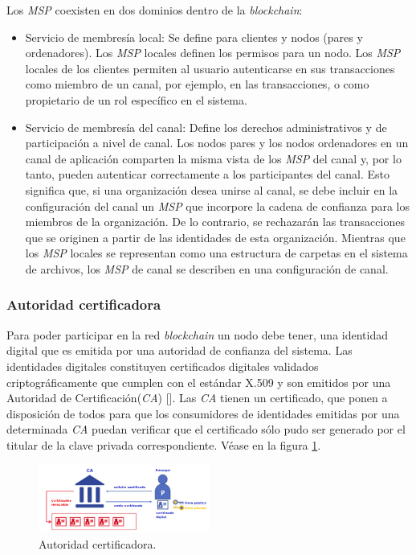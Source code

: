 Los \emph{MSP} coexisten en dos dominios dentro de la \emph{blockchain}:
\begin{itemize}
\item Servicio de membres\'ia local: Se define para clientes y nodos (pares y ordenadores). Los \emph{MSP} locales definen los permisos para un nodo. Los \emph{MSP} locales de los clientes permiten al usuario autenticarse en sus transacciones como miembro de un canal, por ejemplo, en las transacciones, o como propietario de un rol espec\'ifico en el sistema.

\item Servicio de membres\'ia del canal: Define los derechos administrativos y de participaci\'on a nivel de canal. Los nodos pares y los nodos ordenadores en un canal de aplicaci\'on comparten la misma vista de los \emph{MSP} del canal y, por lo tanto, pueden autenticar correctamente a los participantes del canal. Esto significa que, si una organizaci\'on desea unirse al canal, se debe incluir en la configuraci\'on del canal un \emph{MSP} que incorpore la cadena de confianza para los miembros de la organizaci\'on. De lo contrario, se rechazar\'an las transacciones que se originen a partir de las identidades de esta organizaci\'on. Mientras que los \emph{MSP} locales se representan como una estructura de carpetas en el sistema de archivos, los \emph{MSP} de canal se describen en una configuraci\'on de canal.
\end{itemize}

\subsubsection{Autoridad certificadora}
Para poder participar en la red \emph{blockchain} un nodo debe tener, una identidad digital que es emitida por una autoridad de confianza del sistema. Las identidades digitales constituyen certificados digitales validados criptogr\'aficamente que cumplen con el est\'andar X.509 y son emitidos por una Autoridad de Certificaci\'on(\emph{CA}) [\cite{CA}]. Las \emph{CA} tienen un certificado, que ponen a disposici\'on de todos para que los consumidores de identidades emitidas por una determinada \emph{CA} puedan verificar que el certificado s\'olo pudo ser generado por el titular de la clave privada correspondiente. V\'ease en la figura \ref{Autoridad certificadora}.

\begin{figure}[h]
\centering
\includegraphics[width=0.5\textwidth]{Graphics/CA.png}
\caption{Autoridad certificadora.}
\label{Autoridad certificadora}
\end{figure}

